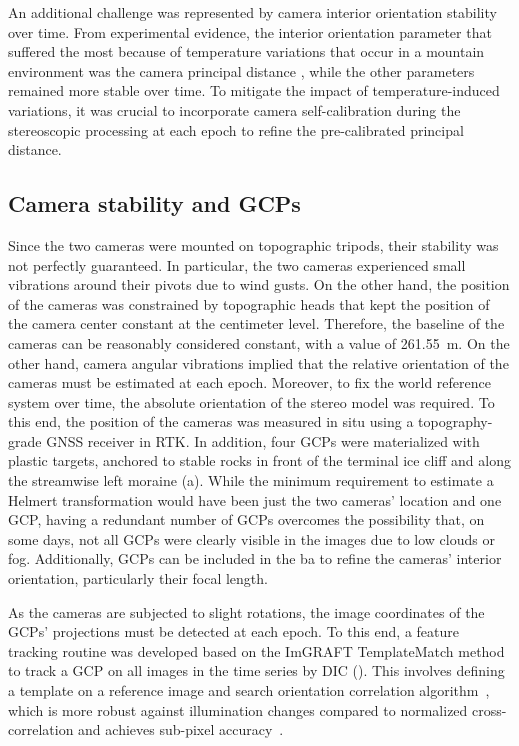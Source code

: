 An additional challenge was represented by camera interior orientation stability over time.
From experimental evidence, the interior orientation parameter that suffered the most because of temperature variations that occur in a mountain environment was the camera principal distance \citep{Elias2020}, while the other parameters remained more stable over time.
To mitigate the impact of temperature-induced variations, it was crucial to incorporate camera self-calibration during the stereoscopic processing at each epoch to refine the pre-calibrated principal distance.

\subsection{Camera stability and GCPs}\label{sec:4:stability}

Since the two cameras were mounted on topographic tripods, their stability was not perfectly guaranteed. In particular, the two cameras experienced small vibrations around their pivots due to wind gusts.
On the other hand, the position of the cameras was constrained by topographic heads that kept the position of the camera center constant at the centimeter level.
Therefore, the baseline of the cameras can be reasonably considered constant, with a value of \SI{261.55}{\meter}.
On the other hand, camera angular vibrations implied that the relative orientation of the cameras must be estimated at each epoch.
Moreover, to fix the world reference system over time, the absolute orientation of the stereo model was required.
To this end, the position of the cameras was measured in situ using a topography-grade GNSS receiver in RTK.
In addition, four GCPs were materialized with plastic targets, anchored to stable rocks in front of the terminal ice cliff and along the streamwise left moraine (a).
While the minimum requirement to estimate a Helmert transformation would have been just the two cameras' location and one GCP, having a redundant number of GCPs overcomes the possibility that, on some days, not all GCPs were clearly visible in the images due to low clouds or fog.
Additionally, GCPs can be included in the \ac{ba} to refine the cameras' interior orientation, particularly their focal length.

As the cameras are subjected to slight rotations, the image coordinates of the GCPs' projections must be detected at each epoch.
To this end, a feature tracking routine was developed based on the ImGRAFT TemplateMatch method~\citep{Messerli2015} to track a GCP on all images in the time series by DIC (). 
This involves defining a template on a reference image and search orientation correlation algorithm~\citep{fitch2002_OC}, which is more robust against illumination changes compared to normalized cross-correlation and achieves sub-pixel accuracy~\citep{Dematteis2021, Heid2012_evaluation_xcorr}.

